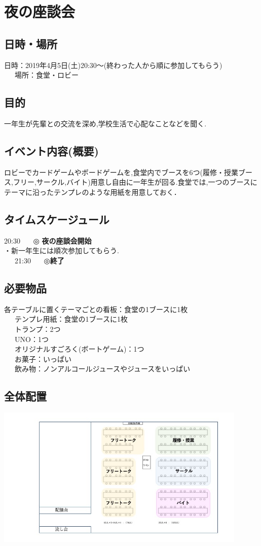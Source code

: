 \documentclass[a4j]{jarticle}
\begin{document}
\section{夜の座談会}
\subsection{日時・場所}
日時：2019年4月5日(土)20:30〜(終わった人から順に参加してもらう)\\
\ \ \ 場所：食堂・ロビー\\
\subsection{目的}
一年生が先輩との交流を深め,学校生活で心配なことなどを聞く.
\subsection{イベント内容(概要)}
ロビーでカードゲームやボードゲームを,食堂内でブースを6つ(履修・授業ブース,フリー,サークル,バイト)用意し自由に一年生が回る.食堂では,一つのブースに
テーマに沿ったテンプレのような用紙を用意しておく．
\subsection{タイムスケージュール}
20:30 \ \ \ ◎ \textbf{夜の座談会開始}\\
\hspace{15mm}・新一年生には順次参加してもらう.\\
\ \ \ 21:30 \ \ \ ◎\textbf{終了}
\subsection{必要物品}
各テーブルに置くテーマごとの看板：食堂の1ブースに1枚\\
\ \ \ テンプレ用紙：食堂の1ブースに1枚\\
\ \ \ トランプ：2つ\\
\ \ \ UNO：1つ\\
\ \ \ オリジナルすごろく(ボートゲーム)：1つ\\
\ \ \ お菓子：いっぱい\\
\ \ \ 飲み物：ノンアルコールジュースやジュースをいっぱい
\subsection{全体配置}
\begin{center}
\includegraphics[width=12cm]{hone.jpg}
\end{center}
\end{document}
